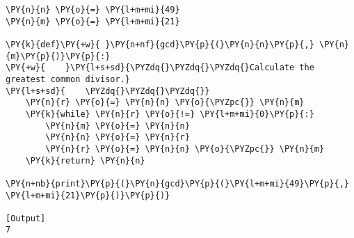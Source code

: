 \begin{Verbatim}[label=\makebox{\href{https://github.com/unipi-physics-labs/statnotes/tree/main/snippy/euclid_algorithm_func.py}{https://github.com/.../euclid\_algorithm\_func.py}},commandchars=\\\{\}]
\PY{n}{n} \PY{o}{=} \PY{l+m+mi}{49}
\PY{n}{m} \PY{o}{=} \PY{l+m+mi}{21}

\PY{k}{def}\PY{+w}{ }\PY{n+nf}{gcd}\PY{p}{(}\PY{n}{n}\PY{p}{,} \PY{n}{m}\PY{p}{)}\PY{p}{:}
\PY{+w}{    }\PY{l+s+sd}{\PYZdq{}\PYZdq{}\PYZdq{}Calculate the greatest common divisor.}
\PY{l+s+sd}{    \PYZdq{}\PYZdq{}\PYZdq{}}
    \PY{n}{r} \PY{o}{=} \PY{n}{n} \PY{o}{\PYZpc{}} \PY{n}{m}
    \PY{k}{while} \PY{n}{r} \PY{o}{!=} \PY{l+m+mi}{0}\PY{p}{:}
        \PY{n}{m} \PY{o}{=} \PY{n}{n}
        \PY{n}{n} \PY{o}{=} \PY{n}{r}
        \PY{n}{r} \PY{o}{=} \PY{n}{n} \PY{o}{\PYZpc{}} \PY{n}{m}
    \PY{k}{return} \PY{n}{n}

\PY{n+nb}{print}\PY{p}{(}\PY{n}{gcd}\PY{p}{(}\PY{l+m+mi}{49}\PY{p}{,} \PY{l+m+mi}{21}\PY{p}{)}\PY{p}{)}

[Output]
7
\end{Verbatim}
